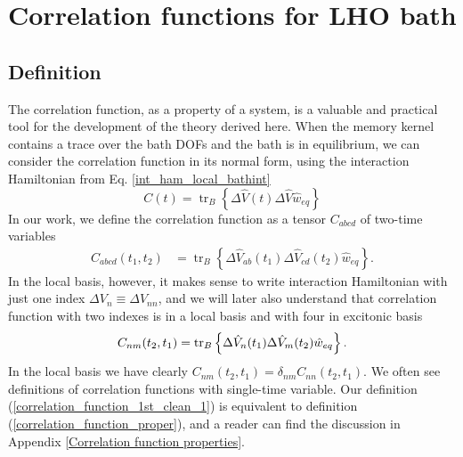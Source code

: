 \section{Correlation functions for LHO bath}
\label{Correlation functions}
\subsection{Definition}
\label{Definition}

The correlation function, as a property of a system, is a valuable and practical tool for the development of the theory derived here. When the memory kernel contains a trace over the bath DOFs and the bath is in equilibrium, we can consider the correlation function in its normal form, using the interaction Hamiltonian from Eq. \ref{int_ham_local_bathint}
\begin{equation}
\label{correlation_function_proper}
    C(t) = \operatorname{tr}_B \left\{ \Delta \hat{V}(t) \Delta \hat{V} \hat{w}_{eq}\right\}
\end{equation}
In our work, we define the correlation function as a tensor $C_{abcd}$ of two-time variables
\begin{equation}
\label{correlation_function_1st_clean_1}
    \begin{aligned}
    C_{abcd}(t_1, t_2) &= \operatorname{tr}_B \left\{ \Delta\hat{V}_{ab}(t_1) \Delta\hat{V}_{cd}(t_2) \hat{w}_{eq}\right\}. 
    \end{aligned}
\end{equation}
In the local basis, however, it makes sense to write interaction Hamiltonian with just one index $\Delta V_n \equiv \Delta V_{nn}$, and we will later also understand that correlation function with two indexes is in a local basis and with four in excitonic basis
\begin{equation}
\label{correlation_function_1st_clean_2}
    C_{nm}(t_2, t_1) = \operatorname{tr}_B \left\{ \Delta\hat{V}_{n}(t_1) \Delta\hat{V}_{m}(t_2) \hat{w}_{eq}\right\}. \\
\end{equation}
In the local basis we have clearly $C_{nm}(t_2, t_1) = \delta_{nm}C_{nn}(t_2, t_1)$. We often see definitions of correlation functions with single-time variable. Our definition (\ref{correlation_function_1st_clean_1}) is equivalent to definition (\ref{correlation_function_proper}), and a reader can find the discussion in Appendix \ref{Correlation function properties}.

